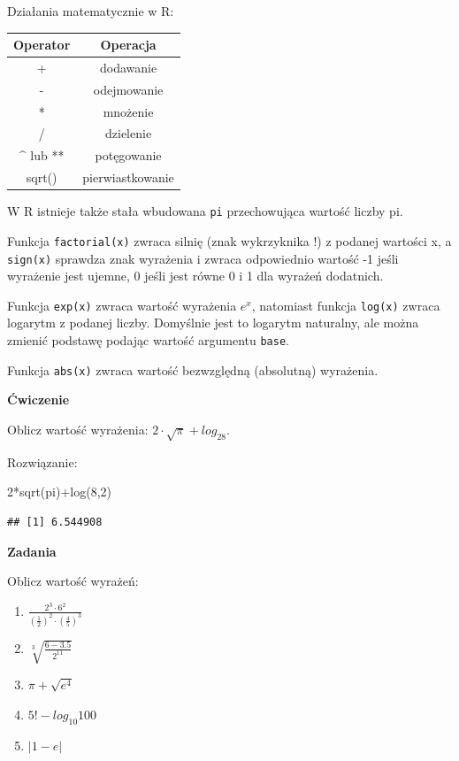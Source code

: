 \documentclass[
]{book}
\newenvironment{Shaded}{\begin{snugshade}}{\end{snugshade}}
\newcommand{\DecValTok}[1]{\textcolor[rgb]{0.00,0.00,0.81}{#1}}
\newcommand{\FunctionTok}[1]{\textcolor[rgb]{0.00,0.00,0.00}{#1}}
\newcommand{\NormalTok}[1]{#1}
\newcommand{\SpecialCharTok}[1]{\textcolor[rgb]{0.00,0.00,0.00}{#1}}
\providecommand{\tightlist}{%
  \setlength{\itemsep}{0pt}\setlength{\parskip}{0pt}}
\begin{document}
Działania matematycznie w R:

\begin{longtable}[]{@{}cc@{}}
\toprule
Operator & Operacja \\
\midrule
\endhead
+ & dodawanie \\
- & odejmowanie \\
* & mnożenie \\
/ & dzielenie \\
\^{} lub ** & potęgowanie \\
sqrt() & pierwiastkowanie \\
\bottomrule
\end{longtable}

W R istnieje także stała wbudowana \texttt{pi} przechowująca wartość liczby pi.

Funkcja \texttt{factorial(x)} zwraca silnię (znak wykrzyknika !) z podanej wartości x, a \texttt{sign(x)} sprawdza znak wyrażenia i zwraca odpowiednio wartość -1 jeśli wyrażenie jest ujemne, 0 jeśli jest równe 0 i 1 dla wyrażeń dodatnich.

Funkcja \texttt{exp(x)} zwraca wartość wyrażenia \(e^x\), natomiast funkcja \texttt{log(x)} zwraca logarytm z podanej liczby. Domyślnie jest to logarytm naturalny, ale można zmienić podstawę podając wartość argumentu \texttt{base}.

Funkcja \texttt{abs(x)} zwraca wartość bezwzględną (absolutną) wyrażenia.

\textbf{Ćwiczenie}

Oblicz wartość wyrażenia: \(2\cdot \sqrt{\pi} + log_28\).

Rozwiązanie:

\begin{Shaded}
\begin{Highlighting}[]
\DecValTok{2}\SpecialCharTok{*}\FunctionTok{sqrt}\NormalTok{(pi)}\SpecialCharTok{+}\FunctionTok{log}\NormalTok{(}\DecValTok{8}\NormalTok{,}\DecValTok{2}\NormalTok{)}
\end{Highlighting}
\end{Shaded}

\begin{verbatim}
## [1] 6.544908
\end{verbatim}

\textbf{Zadania}

Oblicz wartość wyrażeń:

\begin{enumerate}
\def\labelenumi{\arabic{enumi}.}
\tightlist
\item
  \(\frac{2^3\cdot6^2}{(\frac{1}{2})^2\cdot(\frac{4}{5})^3}\)
\item
  \(\sqrt[3]{\frac{6-3.5}{2^{11}}}\)
\item
  \(\pi+\sqrt{e^4}\)
\item
  \(5! - log_{10}100\)
\item
  \(|1-e|\)
\end{enumerate}
\end{document}
